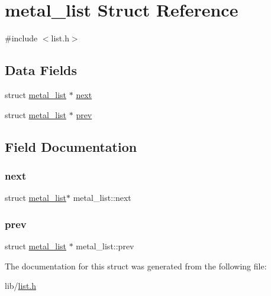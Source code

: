 \hypertarget{structmetal__list}{}\section{metal\+\_\+list Struct Reference}
\label{structmetal__list}


{\ttfamily \#include $<$list.\+h$>$}

\subsection*{Data Fields}
\begin{DoxyCompactItemize}
\item 
struct \hyperlink{structmetal__list}{metal\+\_\+list} $\ast$ \hyperlink{structmetal__list_ac230ff75196e672a80c4a4520294a7fc}{next}
\item 
struct \hyperlink{structmetal__list}{metal\+\_\+list} $\ast$ \hyperlink{structmetal__list_ada1c8bdeec046c44a68e5adb22813409}{prev}
\end{DoxyCompactItemize}


\subsection{Field Documentation}
\mbox{\label{structmetal__list_ac230ff75196e672a80c4a4520294a7fc}} 
\subsubsection{\texorpdfstring{next}{next}}
{\footnotesize\ttfamily struct \hyperlink{structmetal__list}{metal\+\_\+list}$\ast$ metal\+\_\+list\+::next}

\mbox{\label{structmetal__list_ada1c8bdeec046c44a68e5adb22813409}} 
\subsubsection{\texorpdfstring{prev}{prev}}
{\footnotesize\ttfamily struct \hyperlink{structmetal__list}{metal\+\_\+list} $\ast$ metal\+\_\+list\+::prev}



The documentation for this struct was generated from the following file\+:\begin{DoxyCompactItemize}
\item 
lib/\hyperlink{list_8h}{list.\+h}\end{DoxyCompactItemize}

